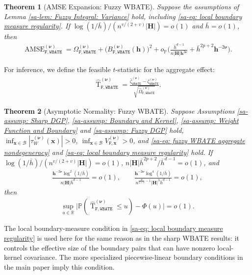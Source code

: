 \documentclass[10pt]{article}
\newtheorem{thm}{Theorem}
\DeclareMathOperator{\Tstat}{T}
\renewcommand{\P}{\mathbb{P}}
\newcommand{\reals}{\mathbb{R}}
\newcommand{\bh}{\mathbf{h}}
\newcommand{\bH}{\mathbf{H}}
\newcommand{\bx}{\mathbf{x}}
\newcommand{\bnu}{\boldsymbol{\nu}}
\newcommand{\B}{\mathcal{B}}
\begin{document}
\begin{thm}[AMSE Expansion: Fuzzy WBATE]\label{sa-thm: MSE Expansion: Fuzzy WBATE}
    Suppose the assumptions of Lemma \ref{sa-lem: Fuzzy Integral: Variance} hold, including \eqref{sa-eq: local boundary measure regularity}. If $\log(1/\bar{h})/(n^{v/(2+v)}|\bH|) = o(1)$ and $\bar{h} = o(1)$, then
    \begin{align*}
        \operatorname{AMSE}_{\mathtt{F,WBATE}}^{(\bnu)}
        = \Omega_{\mathtt{F,WBATE}}^{(\bnu)} + \big(B_{\mathtt{F,WBATE}}^{(\bnu)}(\bh)\big)^2
        + o_{\P}\Big(\frac{\bar{h}^{d-1}}{n|\bH|\bh^{2\bnu}} + \bar{h}^{2p+2}\bh^{-2\bnu}\Big).
    \end{align*}
\end{thm}

For inference, we define the feasible $t$-statistic for the aggregate effect:
\begin{align*}
    \widehat{\Tstat}_{\mathtt{F,WBATE}}^{(\bnu)} = \frac{\widehat{\zeta}_{\mathtt{WBATE}}^{(\bnu)} - \zeta_{\mathtt{WBATE}}^{(\bnu)}}{\sqrt{\widehat{\Omega}_{\mathtt{F,WBATE}}^{(\bnu)}}}.
\end{align*}

\begin{thm}[Asymptotic Normality: Fuzzy WBATE]\label{sa-thm: Asymptotic Normality: Fuzzy WBATE}
    Suppose Assumptions \ref{sa-assump: Sharp DGP}, \ref{sa-assump: Boundary and Kernel}, \ref{sa-assump: Weight Function and Boundary} and \ref{sa-assump: Fuzzy DGP} hold, $\inf_{\bx\in\B}|\tau_W^{(\bnu)}(\bx)|>0$, $\inf_{\bx\in\B}V_{\mathtt{F},\bx}^{(\bnu)}>0$, and \eqref{sa-eq: fuzzy WBATE aggregate nondegeneracy} and \eqref{sa-eq: local boundary measure regularity} hold. If $\log(1/\bar{h})/(n^{v/(2+v)}|\bH|) = o(1)$, $n|\bH|\bar{h}^{2p+2}/\bar{h}^{d-1} = o(1)$, and
    \begin{align*}
        \frac{\bh^{-2\bnu}\log^2(1/\bar{h})}{n|\bH|\bar{h}^{d-1}}=o(1),
        \qquad
        \frac{\bh^{-2\bnu}\log^4(1/\bar{h})}{n^{\frac{4v}{2+v}-1}|\bH|^3\bar{h}^{d-1}}=o(1),
    \end{align*}
    then
    \begin{align*}
        \sup_{u \in \reals} \big|\P (\widehat{\Tstat}_{\mathtt{F,WBATE}}^{(\bnu)} \leq u )  - \Phi(u) \big| = o(1).
    \end{align*}
\end{thm}

The local boundary-measure condition in \eqref{sa-eq: local boundary measure regularity} is used here for the same reason as in the sharp WBATE results: it controls the effective size of the boundary pairs that can have nonzero local-kernel covariance. The more specialized piecewise-linear boundary conditions in the main paper imply this condition.
\end{document}
